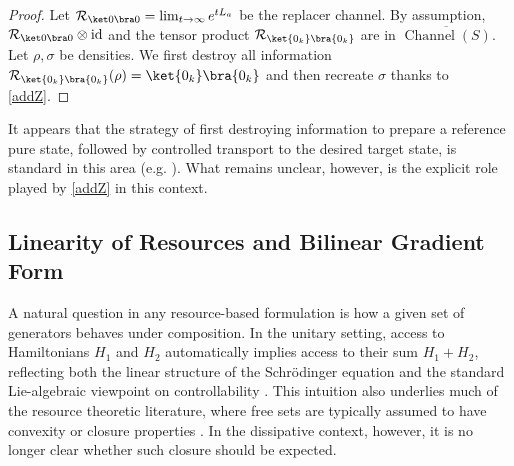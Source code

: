 \documentclass[11pt,reqno]{amsart}
\theoremstyle{definition}
\newcommand{\mc}{\mathcal}
\DeclareMathOperator{\id}{id}
\DeclareMathOperator{\chan}{Channel}
\begin{document}
\begin{proof}
    Let $\mc R_{\ket 0\bra 0}=\lim_{t\to \infty}e^{tL_a}$ be the replacer channel. By assumption, $\mc R_{\ket 0\bra 0}\otimes \id$ and  the tensor product $\mc R_{\ket{0_k}\bra{0_k}}$ are in $\overline{\chan(S)}$. Let $\rho,\sigma$ be densities. We first destroy all information $\mc R_{\ket{0_k}\bra{0_k}}(\rho)=\ket{0_k}\bra{0_k}$ and then recreate $\sigma$ thanks to \cref{addZ}.  
\end{proof}
It appears that the strategy of first destroying information to prepare a reference pure state, followed by controlled transport to the desired target state, is standard in this area (e.g. \cite{dong2008, dirr2019}). What remains unclear, however, is the explicit role played by \cref{addZ} in this context.


\subsection{Linearity of Resources and Bilinear Gradient Form}\label{obstructions}
A natural question in any resource-based formulation is how a given set of generators behaves under composition. 
In the unitary setting, access to Hamiltonians $H_1$ and $H_2$ automatically implies access to their sum $H_1+H_2$, reflecting both the linear structure of the Schr\"odinger equation and the standard Lie-algebraic viewpoint on controllability \cite{JurdjevicSussmann1972,dalessandro2021}. 
This intuition also underlies much of the resource theoretic literature, where free sets are typically assumed to have convexity or closure properties \cite{ChitambarGour2019,BrandaoGour2015}. 
In the dissipative context, however, it is no longer clear whether such closure should be expected.
\end{document}
